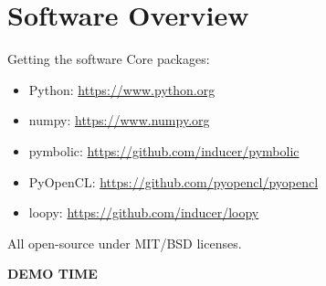 \documentclass[english,compress]{beamer}
\def\bigncentered#1{
  \begin{center}
    \Huge\bfseries #1
  \end{center}
}
\begin{document}
\section{Software Overview}
\begin{frame}{Getting the software}
  Core packages:
  \begin{itemize}
    \item Python: \url{https://www.python.org}
    \item numpy: \url{https://www.numpy.org}
    \item pymbolic: \url{https://github.com/inducer/pymbolic}
    \item PyOpenCL: \url{https://github.com/pyopencl/pyopencl}
    \item loopy: \url{https://github.com/inducer/loopy}
  \end{itemize}
  All open-source under MIT/BSD licenses.
\end{frame}
\begin{comment}
\begin{frame}{Installing the software}
  \begin{itemize}
    \item Demo: \texttt{virtualenv}
    \item Demo: \texttt{pip}
  \end{itemize}
\end{frame}
\end{comment}
\begin{frame}
  \bigncentered{DEMO TIME}
\end{frame}
\end{document}
